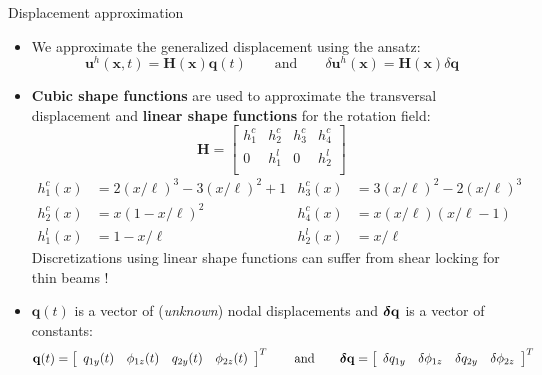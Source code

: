 \documentclass[aspectratio=169]{beamer}
\begin{document}
{
\color{white}
\begin{frame}{Displacement approximation}
  \small
  \begin{itemize}
    \small
    \item We approximate the generalized displacement using the ansatz:
          \[            \mathbf u^{h}(\mathbf x,t) = \mathbf H(\mathbf x)\mathbf q(t)    \qquad \text{and} \qquad
            \delta\mathbf u^{h}(\mathbf x)  =\mathbf H(\mathbf x)\delta\mathbf q
          \]
    \item   \small\textbf{Cubic shape functions} are used to approximate the transversal displacement and \textbf{linear shape functions} for the rotation field:
          $$
            \mathbf H=\left[
              \begin{array}{cccc}
                h^c_1 & h^c_2 & h^c_3 & h^c_4 \\[0.5em]
                0     & h^l_1 & 0     & h^l_2 \\
              \end{array} \right]
          $$
          \vspace{-0.1cm}
          \begin{align*}
            h^c_1(x) & =2(x/\ell)^3-3(x/\ell)^2+1 & h^c_3(x) & =3(x/\ell)^2-2(x/\ell)^3 \\
            h^c_2(x) & =x(1-x/\ell)^2             & h^c_4(x) & =x(x/\ell)(x/\ell-1)     \\
            h^l_1(x) & = 1-x/\ell                 & h^l_2(x) & = x/\ell
          \end{align*}
          {\footnotesize\color{orange} Discretizations using linear shape functions can suffer from shear locking for thin beams !}
    \item   \small$\mathbf q(t)$ is a vector of (\emph{unknown}) nodal displacements and  $\boldsymbol\delta \mathbf q$ is a vector of constants:
          $$\mathbf q(t)=\left[
              \begin{array}{cccc}
                q_{1y}(t) & \phi_{1z}(t) & q_{2y}(t) & \phi_{2z}(t)
              \end{array} \right]^T\qquad \text{and}\qquad\boldsymbol\delta\mathbf q=\left[\begin{array}{cccc}
                \delta q_{1y} & \delta \phi_{1z} & \delta q_{2y} & \delta \phi_{2z}
              \end{array}\right]^T$$
  \end{itemize}
\end{frame}

}
\end{document}

